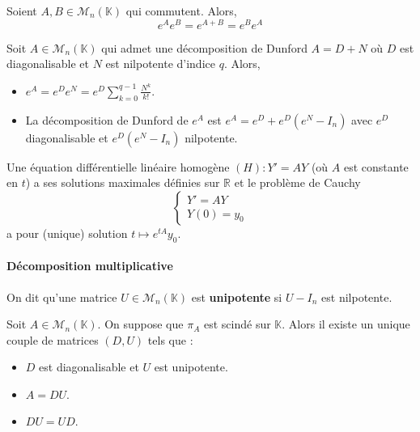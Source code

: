   \begin{proposition}
    Soient $A, B \in \mathcal{M}_n(\mathbb{K})$ qui commutent. Alors,
    \[ e^A e^B = e^{A+B} = e^B e^A \]
  \end{proposition}
  
  \begin{example}
    Soit $A \in \mathcal{M}_n(\mathbb{K})$ qui admet une décomposition de Dunford $A = D+N$ où $D$ est diagonalisable et $N$ est nilpotente d'indice $q$. Alors,
    \begin{itemize}
      \item $e^A = e^D e^N = e^D \sum_{k=0}^{q-1} \frac{N^k}{k!}$.
      \item La décomposition de Dunford de $e^A$ est $e^A = e^D + e^D(e^N - I_n)$ avec $e^D$ diagonalisable et $e^D(e^N - I_n)$ nilpotente.
    \end{itemize}
  \end{example}
  
  
  \begin{application}
    Une équation différentielle linéaire homogène $(H) : Y' = AY$ (où $A$ est constante en $t$) a ses solutions maximales définies sur $\mathbb{R}$ et le problème de Cauchy
    \[ \begin{cases} Y' = AY \\ Y(0) = y_0 \end{cases} \]
    a pour (unique) solution $t \mapsto e^{tA} y_0$.
  \end{application}
  
  \paragraph{Décomposition multiplicative}
  
  
  \begin{definition}
    On dit qu'une matrice $U \in \mathcal{M}_n(\mathbb{K})$ est \textbf{unipotente} si $U - I_n$ est nilpotente.
  \end{definition}
  
  \begin{theorem}
    Soit $A \in \mathcal{M}_n(\mathbb{K})$. On suppose que $\pi_A$ est scindé sur $\mathbb{K}$. Alors il existe un unique couple de matrices $(D, U)$ tels que :
    \begin{itemize}
      \item $D$ est diagonalisable et $U$ est unipotente.
      \item $A = DU$.
      \item $DU = UD$.
    \end{itemize}
  \end{theorem}
    
